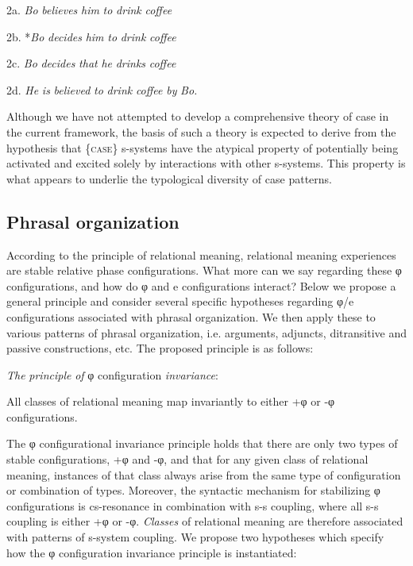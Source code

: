   2a.  \textit{Bo} \textit{believes} \textit{him} \textit{to} \textit{drink} \textit{coffee}

  2b.  *\textit{Bo} \textit{decides} \textit{him} \textit{to} \textit{drink} \textit{coffee}

  2c.  \textit{Bo} \textit{decides} \textit{that} \textit{he} \textit{drinks} \textit{coffee}

  2d.   \textit{He} \textit{is} \textit{believed} \textit{to} \textit{drink} \textit{coffee} \textit{by} \textit{Bo.}

  Although we have not attempted to develop a comprehensive theory of case in the current framework, the basis of such a theory is expected to derive from the hypothesis that \{\textsc{case}\} s-systems have the atypical property of potentially being activated and excited solely by interactions with other s-systems. This property is what appears to underlie the typological diversity of case patterns. 

\subsection{Phrasal organization}

According to the principle of relational meaning, relational meaning experiences are stable relative phase configurations. What more can we say regarding these φ configurations, and how do φ and e configurations interact? Below we propose a general principle and consider several specific hypotheses regarding φ/e configurations associated with phrasal organization. We then apply these to various patterns of phrasal organization, i.e. arguments, adjuncts, ditransitive and passive constructions, etc. The proposed principle is as follows:

\textit{The} \textit{principle} \textit{of} φ configuration \textit{invariance}: 

  All classes of relational meaning map invariantly to either +φ or -φ configurations. 

  The φ configurational invariance principle holds that there are only two types of stable configurations, +φ and -φ, and that for any given class of relational meaning, instances of that class always arise from the same type of configuration or combination of types. Moreover, the syntactic mechanism for stabilizing φ configurations is cs-resonance in combination with s-s coupling, where all s-s coupling is either +φ or -φ. \textit{Classes} of relational meaning are therefore associated with patterns of s-system coupling. We propose two hypotheses which specify how the φ configuration invariance principle is instantiated:

